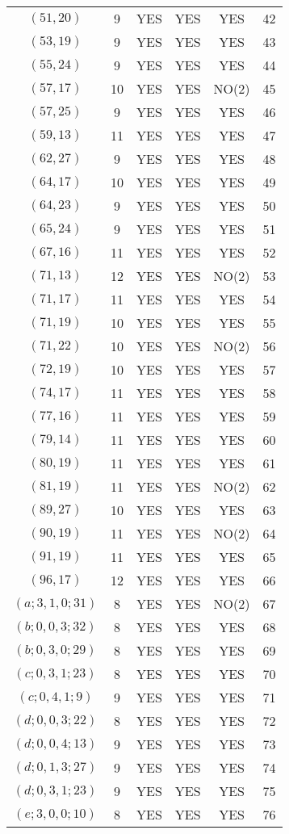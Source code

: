 \begin{longtable}{|c|c|c|c|c|c|}
$(51, 20)$ & 9 & YES & YES & YES & 42\\
$(53, 19)$ & 9 & YES & YES & YES & 43\\
$(55, 24)$ & 9 & YES & YES & YES & 44\\
$(57, 17)$ & 10 & YES & YES & NO(2) & 45\\
$(57, 25)$ & 9 & YES & YES & YES & 46\\
$(59, 13)$ & 11 & YES & YES & YES & 47\\
$(62, 27)$ & 9 & YES & YES & YES & 48\\
$(64, 17)$ & 10 & YES & YES & YES & 49\\
$(64, 23)$ & 9 & YES & YES & YES & 50\\
$(65, 24)$ & 9 & YES & YES & YES & 51\\
$(67, 16)$ & 11 & YES & YES & YES & 52\\
$(71, 13)$ & 12 & YES & YES & NO(2) & 53\\
$(71, 17)$ & 11 & YES & YES & YES & 54\\
$(71, 19)$ & 10 & YES & YES & YES & 55\\
$(71, 22)$ & 10 & YES & YES & NO(2) & 56\\
$(72, 19)$ & 10 & YES & YES & YES & 57\\
$(74, 17)$ & 11 & YES & YES & YES & 58\\
$(77, 16)$ & 11 & YES & YES & YES & 59\\
$(79, 14)$ & 11 & YES & YES & YES & 60\\
$(80, 19)$ & 11 & YES & YES & YES & 61\\
$(81, 19)$ & 11 & YES & YES & NO(2) & 62\\
$(89, 27)$ & 10 & YES & YES & YES & 63\\
$(90, 19)$ & 11 & YES & YES & NO(2) & 64\\
$(91, 19)$ & 11 & YES & YES & YES & 65\\
$(96, 17)$ & 12 & YES & YES & YES & 66\\
$(a; 3, 1, 0; 31)$ & 8 & YES & YES & NO(2) & 67\\
$(b; 0, 0, 3; 32)$ & 8 & YES & YES & YES & 68\\
$(b; 0, 3, 0; 29)$ & 8 & YES & YES & YES & 69\\
$(c; 0, 3, 1; 23)$ & 8 & YES & YES & YES & 70\\
$(c; 0, 4, 1; 9)$ & 9 & YES & YES & YES & 71\\
$(d; 0, 0, 3; 22)$ & 8 & YES & YES & YES & 72\\
$(d; 0, 0, 4; 13)$ & 9 & YES & YES & YES & 73\\
$(d; 0, 1, 3; 27)$ & 9 & YES & YES & YES & 74\\
$(d; 0, 3, 1; 23)$ & 9 & YES & YES & YES & 75\\
$(e; 3, 0, 0; 10)$ & 8 & YES & YES & YES & 76
\end{longtable}
